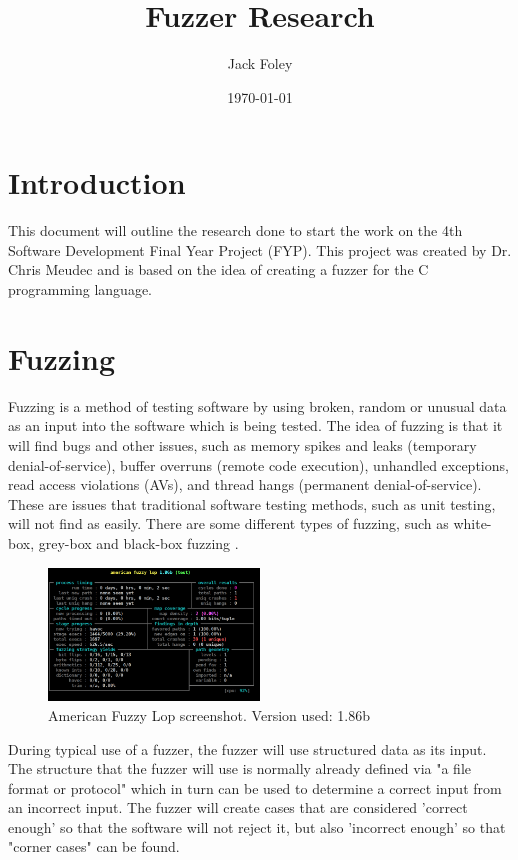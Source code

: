 \documentclass[a4paper,12pt]{article}
\title{Fuzzer Research}
\author{Jack Foley}
\date{\today}
\begin{document}
\maketitle

\newpage
{}
\tableofcontents
\listoffigures

\newpage
{}

\section{Introduction}
This document will outline the research done to start the work on the 4th Software Development Final Year Project (FYP). This project was created by Dr. Chris Meudec and is based on the idea of creating a fuzzer for the C programming language.

\section{Fuzzing}


Fuzzing is a method of testing software by using broken, random or unusual data as an input 
into the software which is being tested. The idea of fuzzing is that it will find bugs and 
other issues, such as memory spikes and leaks (temporary denial-of-service), buffer overruns 
(remote code execution), unhandled exceptions, read access violations (AVs), and thread 
hangs (permanent denial-of-service). These are issues that traditional software testing 
methods, such as unit testing, will not find as easily. There are some different types of 
fuzzing, such as white-box, grey-box and black-box fuzzing \cite{neystadt2009}.

\begin{figure} %
    \centering
    \caption{American Fuzzy Lop screenshot. Version used: 1.86b \cite{enwiki:1249540069}}
    \includegraphics[width=0.5\textwidth]{afl.png}
\end{figure}

During typical use of a fuzzer, the fuzzer will use structured data as its input. The 
structure that the fuzzer will use is normally already defined via "a file format or 
protocol" \cite{enwiki:1249540069} which in turn can be used to determine a correct input
from an incorrect input. The fuzzer will create cases that are considered 
'correct enough' so that the software will not reject it, but also 'incorrect enough' so 
that "corner cases" \cite{enwiki:1249540069} can be found.
\end{document}
